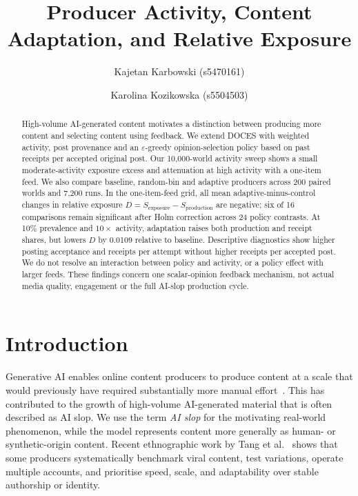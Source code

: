 \documentclass[runningheads]{llncs}
\begin{document}
%
\title{Producer Activity, Content Adaptation, and Relative Exposure}
%
%
\author{Kajetan Karbowski (s5470161) \and
Karolina Kozikowska (s5504503)}
%
%
%
\maketitle              %
%
\begin{abstract}
High-volume AI-generated content motivates a distinction between producing more content and selecting content using feedback. We extend DOCES with weighted activity, post provenance and an \(\varepsilon\)-greedy opinion-selection policy based on past receipts per accepted original post. Our 10,000-world activity sweep shows a small moderate-activity exposure excess and attenuation at high activity with a one-item feed. We also compare baseline, random-bin and adaptive producers across 200 paired worlds and 7,200 runs. In the one-item-feed grid, all mean adaptive-minus-control changes in relative exposure \(D=S_{\mathrm{exposure}}-S_{\mathrm{production}}\) are negative; six of 16 comparisons remain significant after Holm correction across 24 policy contrasts. At 10\% prevalence and \(10\times\) activity, adaptation raises both production and receipt shares, but lowers \(D\) by 0.0109 relative to baseline. Descriptive diagnostics show higher posting acceptance and receipts per attempt without higher receipts per accepted post. We do not resolve an interaction between policy and activity, or a policy effect with larger feeds. These findings concern one scalar-opinion feedback mechanism, not actual media quality, engagement or the full AI-slop production cycle.
\end{abstract}

\section{Introduction}

Generative AI enables online content producers to produce content at a scale that would previously have required substantially more manual effort~\cite{tang2026}. This has contributed to the growth of high-volume AI-generated material that is often described as AI slop. We use the term \emph{AI slop} for the motivating real-world phenomenon, while the model represents content more generally as human- or synthetic-origin content. Recent ethnographic work by Tang et al.~\cite{tang2026} shows that some producers systematically benchmark viral content, test variations, operate multiple accounts, and prioritise speed, scale, and adaptability over stable authorship or identity.
\end{document}
